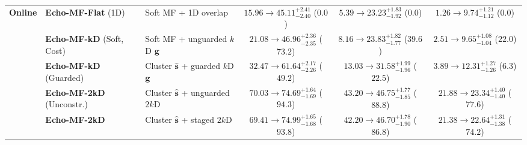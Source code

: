 \documentclass[10pt,a4paper]{article}
\begin{document}
\begin{table}[!htbp]
{\begin{tabular}{@{}lllccc@{}}
\midrule
\textbf{Online} & \textbf{Echo-MF-Flat} (1D) & Soft MF + 1D overlap & $15.96 \rightarrow 45.11^{+2.41}_{-2.40}$ ($0.0$) & $5.39 \rightarrow 23.23^{+1.83}_{-1.92}$ ($0.0$) & $1.26 \rightarrow 9.74^{+1.21}_{-1.12}$ ($0.0$) \\
 & \textbf{Echo-MF-kD} (Soft, Cost) & Soft MF + unguarded $k$D $\boldsymbol{g}$ & $21.08 \rightarrow 46.96^{+2.36}_{-2.35}$ ($73.2$) & $8.16 \rightarrow 23.83^{+1.82}_{-1.77}$ ($39.6$) & $2.51 \rightarrow 9.65^{+1.08}_{-1.04}$ ($22.0$) \\
 & \textbf{Echo-MF-kD} (Guarded) & Cluster $\hat{\boldsymbol{s}}$ + guarded $k$D $\boldsymbol{g}$ & $32.47 \rightarrow 61.64^{+2.17}_{-2.26}$ ($49.2$) & $13.03 \rightarrow 31.58^{+1.99}_{-1.96}$ ($22.5$) & $3.89 \rightarrow 12.31^{+1.27}_{-1.26}$ ($6.3$) \\
 & \textbf{Echo-MF-2kD} (Unconstr.) & Cluster $\hat{\boldsymbol{s}}$ + unguarded $2k$D & $70.03 \rightarrow 74.69^{+1.64}_{-1.69}$ ($94.3$) & $43.20 \rightarrow \mathbf{46.75}^{+1.77}_{-1.85}$ ($88.8$) & $21.88 \rightarrow \mathbf{23.34}^{+1.40}_{-1.40}$ ($77.6$) \\
 & \textbf{Echo-MF-2kD} & Cluster $\hat{\boldsymbol{s}}$ + staged $2k$D & $69.41 \rightarrow \mathbf{74.99}^{+1.65}_{-1.68}$ ($93.8$) & $42.20 \rightarrow 46.70^{+1.78}_{-1.90}$ ($86.8$) & $21.38 \rightarrow 22.64^{+1.31}_{-1.38}$ ($74.2$) \\
\bottomrule
\end{tabular}%
}
\end{table}
\end{document}
